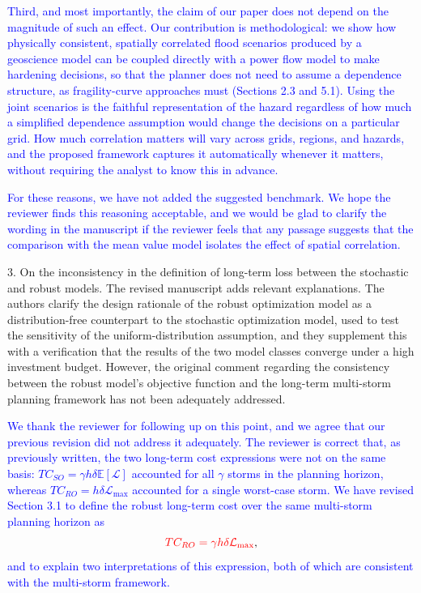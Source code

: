 \documentclass[authoryear,preprint,review,12pt]{elsarticle}\usepackage{amssymb}
\begin{document}
\textcolor{blue}{Third, and most importantly, the claim of our paper does not depend on the magnitude of such an effect. Our contribution is methodological: we show how physically consistent, spatially correlated flood scenarios produced by a geoscience model can be coupled directly with a power flow model to make hardening decisions, so that the planner does not need to assume a dependence structure, as fragility-curve approaches must (Sections 2.3 and 5.1). Using the joint scenarios is the faithful representation of the hazard regardless of how much a simplified dependence assumption would change the decisions on a particular grid. How much correlation matters will vary across grids, regions, and hazards, and the proposed framework captures it automatically whenever it matters, without requiring the analyst to know this in advance.}

\textcolor{blue}{For these reasons, we have not added the suggested benchmark. We hope the reviewer finds this reasoning acceptable, and we would be glad to clarify the wording in the manuscript if the reviewer feels that any passage suggests that the comparison with the mean value model isolates the effect of spatial correlation.}

\bigskip

3. On the inconsistency in the definition of long-term loss between the stochastic and robust models. The revised manuscript adds relevant explanations. The authors clarify the design rationale of the robust optimization model as a distribution-free counterpart to the stochastic optimization model, used to test the sensitivity of the uniform-distribution assumption, and they supplement this with a verification that the results of the two model classes converge under a high investment budget. However, the original comment regarding the consistency between the robust model's objective function and the long-term multi-storm planning framework has not been adequately addressed.

\textcolor{blue}{We thank the reviewer for following up on this point, and we agree that our previous revision did not address it adequately. The reviewer is correct that, as previously written, the two long-term cost expressions were not on the same basis: $TC_{SO} = \gamma h \delta \mathbb{E}[\mathcal{L}]$ accounted for all $\gamma$ storms in the planning horizon, whereas $TC_{RO} = h \delta \mathcal{L}_{\max}$ accounted for a single worst-case storm. We have revised Section 3.1 to define the robust long-term cost over the same multi-storm planning horizon as
\begin{equation*}
    \textcolor{red}{TC_{RO} = \gamma h \delta \mathcal{L}_{\max}},
\end{equation*}
and to explain two interpretations of this expression, both of which are consistent with the multi-storm framework.}
\end{document}

